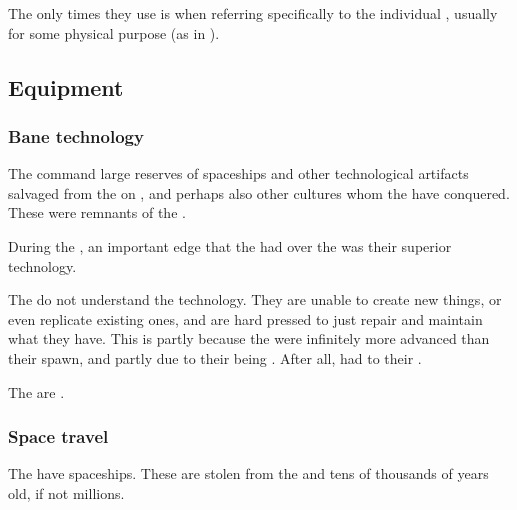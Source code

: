 The only times they use  is when referring specifically to the individual \banelord, usually for some physical purpose 
(as in ). 









\subsection{Equipment}





\subsubsection{Bane technology}
The \banes{} command large reserves of spaceships and other technological artifacts salvaged from the \voyagers{} on \Erebos, and perhaps also other cultures whom the \banes{} have conquered. These were remnants of the .

During the , an important edge that the \banes{} had over the \Miithians was their superior technology. 



The \banes{} do not understand the technology. They are unable to create new things, or even replicate existing ones, and are hard pressed to just repair and maintain what they have. 
This is partly because the \voyagers{} were infinitely more advanced than their \bane{} spawn, and partly due to their being . 
After all, 
 had to 
 their 
.

The  are .





\subsubsection{Space travel}
The \banes{} have spaceships. 
These are stolen from the \voyagers{} and tens of thousands of years old, if not millions. 

